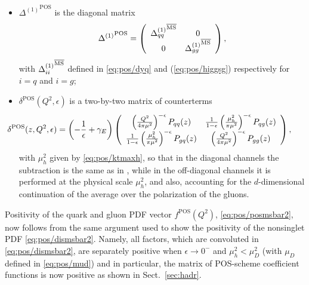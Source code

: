 \begin{itemize}
  \item $ {\Delta^{(1)}}^{{\textrm{POS}}}$ is the diagonal matrix
  \begin{equation}\label{eq:pos/Deltamat}
    {\Delta^{(1)}}^{{\textrm{POS}}}=\left(\begin{array}{cc} {\Delta_{qq}^{(1)}}^{{\overline{\textrm{MS}}}} &
    0 \\0 & {\Delta_{gg}^{(1)}}^{{\overline{\textrm{MS}}}} \end{array}\right),
  \end{equation}
  with  ${\Delta_{ii}^{(1)}}^{{\overline{\textrm{MS}}}}$ defined in \cref{eq:pos/dyq} and
  (\ref{eq:pos/higgsg}) respectively for $i=q$ and $i=g$;
  \item $\delta^{{\textrm{POS}}} (Q^2,\epsilon)$ is a two-by-two matrix of
    counterterms
  \begin{equation}\label{eq:pos/deltamat}
  \hspace*{-3em}\delta^{{\textrm{POS}}} (z,Q^2,\epsilon)= \left(-\frac 1
      {\epsilon}+\gamma_E\right) \left(\begin{array}{cc}  \left(\frac{Q^2}{4\pi
        \mu^2}\right)^{-\epsilon} P_{qq}(z) & \frac{1}{1-\epsilon}\left(\frac{\mu_h^2}{\pi\mu^2}\right)^{-\epsilon} 
    P_{qg}(z)   \\\frac{1}{1-\epsilon}\left(\frac{\mu_h^2}{\pi\mu^2}\right)^{-\epsilon} P_{gq}(z)  & \left(\frac{Q^2}{4\pi
        \mu^2}\right)^{-\epsilon} P_{gg}(z)  \end{array}\right),
  \end{equation}
  with $\mu_h^2$ given by  \cref{eq:pos/ktmaxh}, so that in the
  diagonal channels the subtraction is the same as in \msbar{}, while in
  the off-diagonal channels it is performed at the physical scale
  $\mu_h^2$, and also, accounting for the $d$-dimensional continuation of
  the  average over the polarization of the gluons.
\end{itemize}

Positivity of the quark and gluon PDF vector $ f^{{\textrm{POS}}}(Q^2)$,
\cref{eq:pos/posmsbar2}, now follows from the same argument used to
show the positivity of the nonsinglet PDF 
\cref{eq:pos/dismsbar2}. Namely, all
factors, which are convoluted in \cref{eq:pos/dismsbar2}, are 
separately positive when $\epsilon \to 0^-$ and  $\mu_h^2 < \mu_D^2$ (with
$\mu_D$ defined in \cref{eq:pos/mud}) and in particular, the matrix of POS-scheme coefficient
functions is now positive as shown in Sect.~\ref{sec:hadr}.

